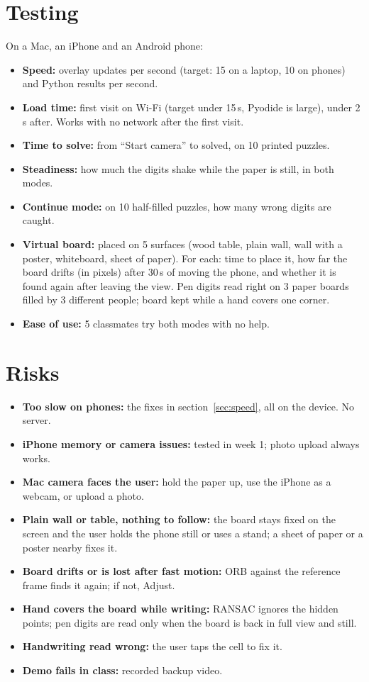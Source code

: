 \documentclass[11pt]{article}
\begin{document}
\section{Testing}

On a Mac, an iPhone and an Android phone:
\begin{itemize}
  \item \textbf{Speed:} overlay updates per second (target: 15 on a laptop, 10 on phones) and Python
        results per second.
  \item \textbf{Load time:} first visit on Wi-Fi (target under 15\,s, Pyodide is large), under 2\,s
        after. Works with no network after the first visit.
  \item \textbf{Time to solve:} from ``Start camera'' to solved, on 10 printed puzzles.
  \item \textbf{Steadiness:} how much the digits shake while the paper is still, in both modes.
  \item \textbf{Continue mode:} on 10 half-filled puzzles, how many wrong digits are caught.
  \item \textbf{Virtual board:} placed on 5 surfaces (wood table, plain wall, wall with a poster,
        whiteboard, sheet of paper). For each: time to place it, how far the board drifts (in
        pixels) after 30\,s of moving the phone, and whether it is found again after leaving the
        view. Pen digits read right on 3 paper boards filled by 3 different people; board kept
        while a hand covers one corner.
  \item \textbf{Ease of use:} 5 classmates try both modes with no help.
\end{itemize}

\section{Risks}

\begin{itemize}
  \item \textbf{Too slow on phones:} the fixes in section~\ref{sec:speed}, all on the device. No server.
  \item \textbf{iPhone memory or camera issues:} tested in week 1; photo upload always works.
  \item \textbf{Mac camera faces the user:} hold the paper up, use the iPhone as a webcam, or upload
        a photo.
  \item \textbf{Plain wall or table, nothing to follow:} the board stays fixed on the screen and the
        user holds the phone still or uses a stand; a sheet of paper or a poster nearby fixes it.
  \item \textbf{Board drifts or is lost after fast motion:} ORB against the reference frame finds
        it again; if not, Adjust.
  \item \textbf{Hand covers the board while writing:} RANSAC ignores the hidden points; pen digits
        are read only when the board is back in full view and still.
  \item \textbf{Handwriting read wrong:} the user taps the cell to fix it.
  \item \textbf{Demo fails in class:} recorded backup video.
\end{itemize}
\end{document}
